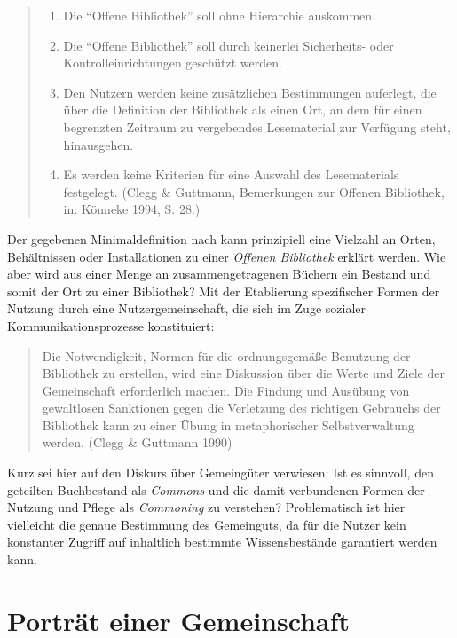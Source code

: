 \documentclass[a4paper,
fontsize=11pt,
oneside,
numbers=noperiodatend,
parskip=half-,
bibliography=totoc,
final
]{scrartcl}
\begin{document}
\begin{quote}
\begin{enumerate}
\def\labelenumi{\arabic{enumi}.}
\itemsep1pt\parskip0pt
\item
  Die \enquote{Offene Bibliothek} soll ohne Hierarchie auskommen.
\item
  Die \enquote{Offene Bibliothek} soll durch keinerlei Sicherheits- oder
  Kontrolleinrichtungen geschützt werden.
\item
  Den Nutzern werden keine zusätzlichen Bestimmungen auferlegt, die über
  die Definition der Bibliothek als einen Ort, an dem für einen
  begrenzten Zeitraum zu vergebendes Lesematerial zur Verfügung steht,
  hinausgehen.
\item
  Es werden keine Kriterien für eine Auswahl des Lesematerials
  festgelegt. (Clegg \& Guttmann, Bemerkungen zur Offenen Bibliothek,
  in: Könneke 1994, S. 28.)
\end{enumerate}
\end{quote}

Der gegebenen Minimaldefinition nach kann prinzipiell eine Vielzahl an
Orten, Behältnissen oder Installationen zu einer \emph{Offenen
Bibliothek} erklärt werden. Wie aber wird aus einer Menge an
zusammengetragenen Büchern ein Bestand und somit der Ort zu einer
Bibliothek? Mit der Etablierung spezifischer Formen der Nutzung durch
eine Nutzergemeinschaft, die sich im Zuge sozialer
Kommunikationsprozesse konstituiert:

\begin{quote}
Die Notwendigkeit, Normen für die ordnungsgemäße Benutzung der
Bibliothek zu erstellen, wird eine Diskussion über die Werte und Ziele
der Gemeinschaft erforderlich machen. Die Findung und Ausübung von
gewaltlosen Sanktionen gegen die Verletzung des richtigen Gebrauchs der
Bibliothek kann zu einer Übung in metaphorischer Selbstverwaltung
werden. (Clegg \& Guttmann 1990)
\end{quote}

Kurz sei hier auf den Diskurs über Gemeingüter verwiesen: Ist es
sinnvoll, den geteilten Buchbestand als \emph{Commons} und die damit
verbundenen Formen der Nutzung und Pflege als \emph{Commoning} zu
verstehen? Problematisch ist hier vielleicht die genaue Bestimmung des
Gemeinguts, da für die Nutzer kein konstanter Zugriff auf inhaltlich
bestimmte Wissensbestände garantiert werden kann.

\section*{Porträt einer
Gemeinschaft}\label{portruxe4t-einer-gemeinschaft}
\end{document}
